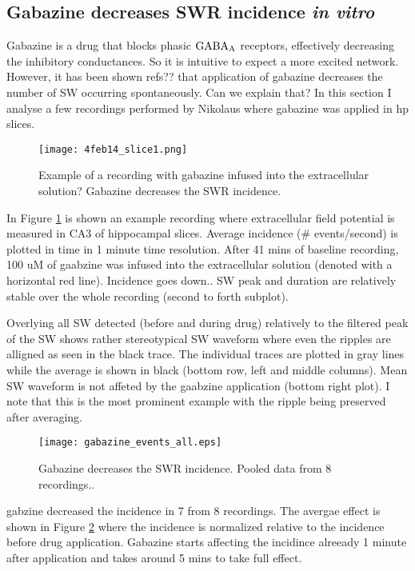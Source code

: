   \subsection{Gabazine decreases SWR incidence {\textit {in vitro}} }
    Gabazine is a drug that blocks phasic $\rm GABA_A$ receptors, effectively decreasing the
    inhibitory conductances. So it is intuitive to expect a more excited
    network. However, it has been shown refs??  that application of gabazine
    decreases the number of SW occurring spontaneously. Can we explain that?  In
    this section I analyse a few recordings performed by Nikolaus where
    gabazine was applied in hp slices.

    \begin{figure}
      \texttt{[image: 4feb14\_slice1.png]}
      \caption{Example of a recording with gabazine infused into the extracellular solution?
                Gabazine decreases the SWR incidence.
             }
      \label{fig:gabazine_ex}
    \end{figure}

    In Figure \ref{fig:gabazine_ex} is shown an example recording where
    extracellular field potential is measured in CA3 of hippocampal slices.
    Average incidence ($\#$ events/second) is plotted in time in 1 minute time
    resolution. After 41 mins of baseline recording, 100 uM of gaabzine was
    infused into the extracellular solution (denoted with a horizontal red
    line). Incidence goes down.. SW peak and duration are relatively stable
    over the whole recording (second to forth subplot).

    Overlying all SW detected (before and during drug) relatively to the
    filtered peak of the SW shows rather stereotypical SW waveform where even
    the ripples are alligned as seen in the black trace. The individual traces
    are plotted in gray lines while the average is shown in black (bottom row,
    left and middle columns). Mean SW waveform is not affeted by the gaabzine
    application (bottom right plot).  I note that this is the most prominent
    example with the ripple being preserved after averaging.


    \begin{figure}
      \texttt{[image: gabazine\_events\_all.eps]}
      \caption{Gabazine decreases the SWR incidence. Pooled data from 8 recordings..}
      \label{fig:gabazine_sum}
    \end{figure}

    gabzine decreased the incidence in 7 from 8 recordings. The avergae effect
    is shown in Figure \ref{fig:gabazine_sum} where the incidence is normalized
    relative to the incidence before drug application. Gabazine starts
    affecting the incidince alreeady 1 minute after application and takes
    around 5 mins to take full effect.

